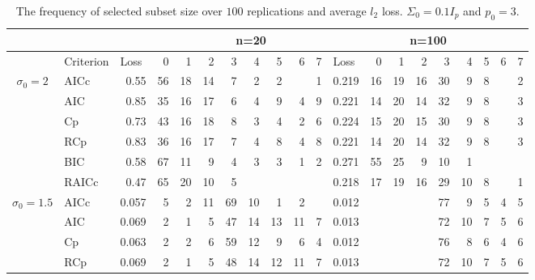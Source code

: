 \documentclass[11pt]{article}
\begin{document}
{\begin{table}[!ht]
\centering
\small
\caption{The frequency of selected subset size over $100$ replications and average $l_2$ loss. $\Sigma_0=0.1 I_p$ and $p_0=3$.}
\begin{tabular}{clrrrrrrrrr|rrrrrrrrr}
      &       &       &       & \multicolumn{7}{c|}{n=20}                             & \multicolumn{9}{c}{n=100} \\
\midrule
      & Criterion & \multicolumn{1}{l}{Loss} & 0     & 1     & 2     & 3     & 4     & 5     & 6     & 7     & \multicolumn{1}{l}{Loss} & 0     & 1     & 2     & 3     & 4     & 5     & 6     & 7 \\
\midrule
\multirow{6}[2]{*}{$\sigma_0=2$} & AICc  & 0.55  & 56    & 18    & 14    & 7     & 2     & 2     &       & 1     & 0.219 & 16    & 19    & 16    & 30    & 9     & 8     &       & 2 \\
      & AIC   & 0.85  & 35    & 16    & 17    & 6     & 4     & 9     & 4     & 9     & 0.221 & 14    & 20    & 14    & 32    & 9     & 8     &       & 3 \\
      & Cp    & 0.73  & 43    & 16    & 18    & 8     & 3     & 4     & 2     & 6     & 0.224 & 15    & 20    & 15    & 30    & 9     & 8     &       & 3 \\
      & RCp   & 0.83  & 36    & 16    & 17    & 7     & 4     & 8     & 4     & 8     & 0.221 & 14    & 20    & 14    & 32    & 9     & 8     &       & 3 \\
      & BIC   & 0.58  & 67    & 11    & 9     & 4     & 3     & 3     & 1     & 2     & 0.271 & 55    & 25    & 9     & 10    & 1     &       &       &  \\
      & RAICc & 0.47  & 65    & 20    & 10    & 5     &       &       &       &       & 0.218 & 17    & 19    & 16    & 29    & 10    & 8     &       & 1 \\
\midrule
\multirow{6}[2]{*}{$\sigma_0=1.5$} & AICc  & 0.057 & 5     & 2     & 11    & 69    & 10    & 1     & 2     &       & 0.012 &       &       &       & 77    & 9     & 5     & 4     & 5 \\
      & AIC   & 0.069 & 2     & 1     & 5     & 47    & 14    & 13    & 11    & 7     & 0.013 &       &       &       & 72    & 10    & 7     & 5     & 6 \\
      & Cp    & 0.063 & 2     & 2     & 6     & 59    & 12    & 9     & 6     & 4     & 0.012 &       &       &       & 76    & 8     & 6     & 4     & 6 \\
      & RCp   & 0.069 & 2     & 1     & 5     & 48    & 14    & 12    & 11    & 7     & 0.013 &       &       &       & 72    & 10    & 7     & 5     & 6 \\

\end{tabular}
\end{table}}
\end{document}
